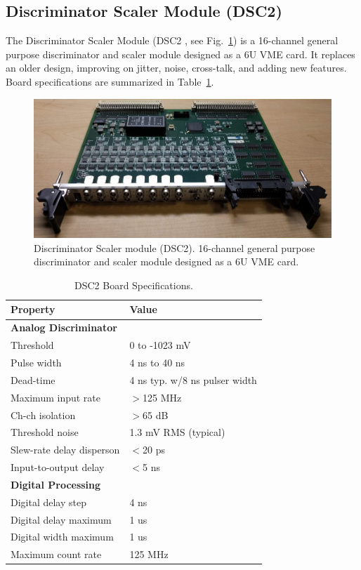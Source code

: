 \subsection{Discriminator Scaler Module (DSC2)}

The Discriminator Scaler Module (DSC2 \cite{dsc2-ref}, see Fig.~\ref{fig:dsc2_board}) is a 16-channel general purpose discriminator and scaler module designed as a 6U VME card. It replaces an older design, improving on jitter, noise, cross-talk, and adding new features.  Board specifications are summarized in Table~\ref{tab:dsc2_specifications}. 

\begin{figure}[hbt]
	\centering
	\includegraphics[width=1.0\columnwidth,keepaspectratio]{img/dsc2_board.png}
	\caption{Discriminator Scaler module (DSC2). 16-channel general purpose discriminator and scaler module designed as a 6U VME card.}
	\label{fig:dsc2_board}
\end{figure}

\begin{table}
\begin{adjustbox}{width=\columnwidth,center}
	\begin{tabular}{| l | l |}
		\hline \hline
		Property			& Value				\\
		\hline
		{\bf Analog Discriminator}	&				\\
		Threshold			& 0 to -1023 mV			\\
		Pulse width			& 4 ns to 40 ns			\\
		Dead-time			& 4 ns typ. w/8 ns pulser width	\\
		Maximum input rate		& $>$125 MHz 			\\
		Ch-ch isolation			& $>$65 dB			\\
		Threshold noise			& 1.3 mV RMS (typical)		\\
		Slew-rate delay disperson	& $<$20 ps			\\
		Input-to-output delay		& $<$5 ns			\\
		{\bf Digital Processing}	&				\\
		Digital delay step		& 4 ns				\\
		Digital delay maximum		& 1 us				\\
		Digital width maximum		& 1 us				\\
		Maximum count rate		& 125 MHz			\\
		\hline \hline
	\end{tabular}
\end{adjustbox}
\caption{DSC2 Board Specifications.}
\label{tab:dsc2_specifications}
\end{table}

